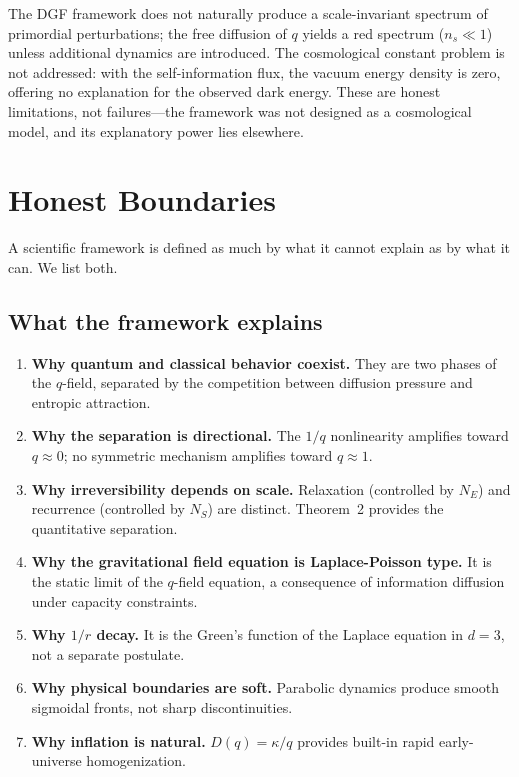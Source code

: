 \documentclass[12pt]{article}
\begin{document}
The DGF framework does not naturally produce a scale-invariant spectrum of primordial perturbations; the free diffusion of $q$ yields a red spectrum ($n_s\ll 1$) unless additional dynamics are introduced. The cosmological constant problem is not addressed: with the self-information flux, the vacuum energy density is zero, offering no explanation for the observed dark energy. These are honest limitations, not failures---the framework was not designed as a cosmological model, and its explanatory power lies elsewhere.

\section{Honest Boundaries}

A scientific framework is defined as much by what it cannot explain as by what it can. We list both.

\subsection{What the framework explains}

\begin{enumerate}
\item \textbf{Why quantum and classical behavior coexist.} They are two phases of the $q$-field, separated by the competition between diffusion pressure and entropic attraction.
\item \textbf{Why the separation is directional.} The $1/q$ nonlinearity amplifies toward $q\approx 0$; no symmetric mechanism amplifies toward $q\approx 1$.
\item \textbf{Why irreversibility depends on scale.} Relaxation (controlled by $N_E$) and recurrence (controlled by $N_S$) are distinct. Theorem~2 provides the quantitative separation.
\item \textbf{Why the gravitational field equation is Laplace-Poisson type.} It is the static limit of the $q$-field equation, a consequence of information diffusion under capacity constraints.
\item \textbf{Why $1/r$ decay.} It is the Green's function of the Laplace equation in $d=3$, not a separate postulate.
\item \textbf{Why physical boundaries are soft.} Parabolic dynamics produce smooth sigmoidal fronts, not sharp discontinuities.
\item \textbf{Why inflation is natural.} $D(q)=\kappa/q$ provides built-in rapid early-universe homogenization.
\end{enumerate}
\end{document}

